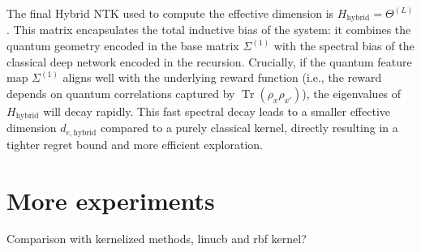 \documentclass[pdflatex,sn-mathphys-num]{sn-jnl}%
\theoremstyle{thmstyleone}%
\theoremstyle{thmstyletwo}%
\theoremstyle{thmstylethree}%
\begin{document}
\begin{appendices}
The final Hybrid NTK used to compute the effective dimension is $H_{\text{hybrid}} = \Theta^{(L)}$. This matrix encapsulates the total inductive bias of the system: it combines the quantum geometry encoded in the base matrix $\Sigma^{(1)}$ with the spectral bias of the classical deep network encoded in the recursion. Crucially, if the quantum feature map $\Sigma^{(1)}$ aligns well with the underlying reward function (i.e., the reward depends on quantum correlations captured by $\operatorname{Tr}(\rho_x \rho_{x'})$), the eigenvalues of $H_{\text{hybrid}}$ will decay rapidly. This fast spectral decay leads to a smaller effective dimension $d_{e, \text{hybrid}}$ compared to a purely classical kernel, directly resulting in a tighter regret bound and more efficient exploration.























\section{More experiments}

Comparison with kernelized methods, linucb and rbf kernel?\fi




\end{appendices}

\end{document}
